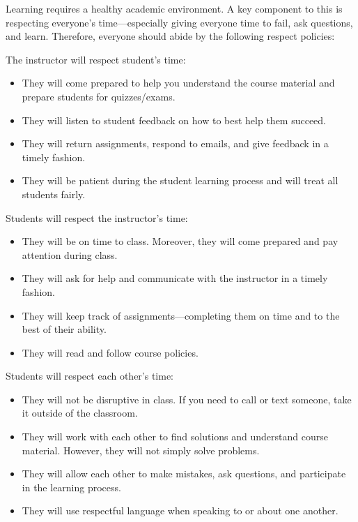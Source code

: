 \documentclass[11pt,letterpaper]{article}
\begin{document}
Learning requires a healthy academic environment. A key component to this is respecting everyone's time---especially giving everyone time to fail, ask questions, and learn. Therefore, everyone should abide by the following respect policies: \pspace

The instructor will respect student's time:
	\begin{itemize}
	\item They will come prepared to help you understand the course material and prepare students for quizzes/exams. 
	\item They will listen to student feedback on how to best help them succeed. 
	\item They will return assignments, respond to emails, and give feedback in a timely fashion. 
	\item They will be patient during the student learning process and will treat all students fairly. 
	\end{itemize} \pspace

Students will respect the instructor's time:
	\begin{itemize}
	\item They will be on time to class. Moreover, they will come prepared and pay attention during class. 
	\item They will ask for help and communicate with the instructor in a timely fashion. 
	\item They will keep track of assignments---completing them on time and to the best of their ability.  
	\item They will read and follow course policies. 
	\end{itemize} \pspace

Students will respect each other's time:
	\begin{itemize}
	\item They will not be disruptive in class. If you need to call or text someone, take it outside of the classroom. 
	\item They will work with each other to find solutions and understand course material. However, they will not simply solve problems. 
	\item They will allow each other to make mistakes, ask questions, and participate in the learning process. 
	\item They will use respectful language when speaking to or about one another. 
	\end{itemize}
\sectionbreak
\end{document}
